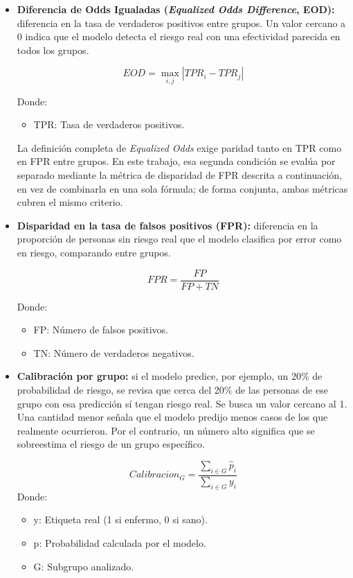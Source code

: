 \documentclass[conference]{IEEEtran}
\begin{document}
\begin{itemize}
\item \textbf{Diferencia de Odds Igualadas (\textit{Equalized Odds Difference}, EOD):} diferencia en la tasa de verdaderos positivos entre grupos. Un valor cercano a 0 indica que el modelo detecta el riesgo real con una efectividad parecida en todos los grupos.

\[
EOD = \max_{i,j} \left| TPR_i - TPR_j \right|
\]

Donde:
\begin{itemize}
\item TPR: Tasa de verdaderos positivos.
\end{itemize}

La definición completa de \textit{Equalized Odds} exige paridad tanto en TPR como en FPR entre grupos. En este trabajo, esa segunda condición se evalúa por separado mediante la métrica de disparidad de FPR descrita a continuación, en vez de combinarla en una sola fórmula; de forma conjunta, ambas métricas cubren el mismo criterio.

\item \textbf{Disparidad en la tasa de falsos positivos (FPR):} diferencia en la proporción de personas sin riesgo real que el modelo clasifica por error como en riesgo, comparando entre grupos.

\[
FPR = \frac{FP}{FP + TN}
\]

Donde:
\begin{itemize}
\item FP: Número de falsos positivos.
\item TN: Número de verdaderos negativos.
\end{itemize}

\item \textbf{Calibración por grupo:} si el modelo predice, por ejemplo, un 20\% de probabilidad de riesgo, se revisa que cerca del 20\% de las personas de ese grupo con esa predicción sí tengan riesgo real. Se busca un valor cercano al 1. Una cantidad menor señala que el modelo predijo menos casos de los que realmente ocurrieron. Por el contrario, un número alto significa que se sobreestima el riesgo de un grupo específico.

\[
Calibracion_G = \frac{\sum_{i \in G} \hat{p}_i}{\sum_{i \in G} y_i}
\]
Donde:
\begin{itemize}
\item y: Etiqueta real (1 si enfermo, 0 si sano).
\item p: Probabilidad calculada por el modelo.
\item G: Subgrupo analizado.
\end{itemize}

\end{itemize}
\end{document}
